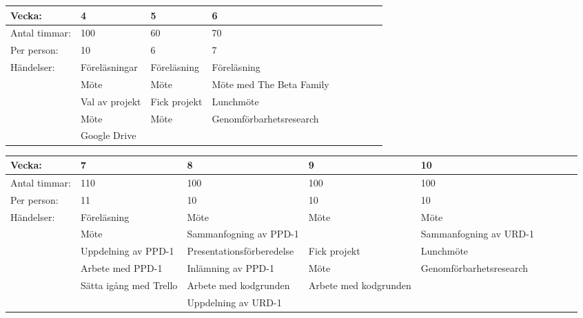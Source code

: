 \begin{center}
    \begin{tabular}{ | l | l | l | l | l | l | l | l | l |}
    \hline
    Vecka: & 4 & 5 & 6 \\ \hline
    Antal timmar: & 100 & 60 & 70 \\ \hline
    Per person: & 10 & 6 & 7 \\ \hline
    Händelser: & Föreläsningar & Föreläsning & Föreläsning \\ \hline
    & Möte & Möte & Möte med The Beta Family  \\ \hline
    & Val av projekt & Fick projekt & Lunchmöte\\ \hline
    & Möte & Möte & Genomförbarhetsresearch\\ \hline
    & Google Drive &  & \\ \hline
    \end{tabular}
\end{center}

\begin{center}
    \begin{tabular}{ | l | l | l | l | l | l | l | l | l |}
    \hline
    Vecka: & 7   & 8 & 9 & 10  \\ \hline
    Antal timmar: & 110 & 100 & 100 & 100\\ \hline
    Per person: & 11 & 10 & 10 & 10 \\ \hline
    Händelser: & Föreläsning & Möte & Möte & Möte\\ \hline
    & Möte & Sammanfogning av PPD-1 & & Sammanfogning av URD-1 \\ \hline
    & Uppdelning av PPD-1 & Presentationsförberedelse & Fick projekt & Lunchmöte \\ \hline
    & Arbete med PPD-1 & Inlämning av PPD-1 & Möte & Genomförbarhetsresearch \\ \hline
    & Sätta igång med Trello & Arbete med kodgrunden & Arbete med kodgrunden & \\ \hline
    & & Uppdelning av URD-1 & & \\ \hline
    \end{tabular}
\end{center}